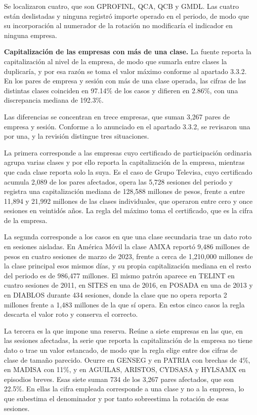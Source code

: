 Se localizaron cuatro, que son GPROFINL, QCA, QCB y GMDL. Las cuatro están deslistadas y ninguna registró importe operado en el periodo, de modo que su incorporación al numerador de la rotación no modificaría el indicador en ninguna empresa.

\textbf{Capitalización de las empresas con más de una clase.} La fuente reporta la capitalización al nivel de la empresa, de modo que sumarla entre clases la duplicaría, y por esa razón se toma el valor máximo conforme al apartado 3.3.2. En los pares de empresa y sesión con más de una clase operada, las cifras de las distintas clases coinciden en 97.14\% de los casos y difieren en 2.86\%, con una discrepancia mediana de 192.3\%.

Las diferencias se concentran en trece empresas, que suman 3,267 pares de empresa y sesión. Conforme a lo anunciado en el apartado 3.3.2, se revisaron una por una, y la revisión distingue tres situaciones.

La primera corresponde a las empresas cuyo certificado de participación ordinaria agrupa varias clases y por ello reporta la capitalización de la empresa, mientras que cada clase reporta solo la suya. Es el caso de Grupo Televisa, cuyo certificado acumula 2,089 de los pares afectados, opera las 5,728 sesiones del periodo y registra una capitalización mediana de 128,588 millones de pesos, frente a entre 11,894 y 21,992 millones de las clases individuales, que operaron entre cero y once sesiones en veintidós años. La regla del máximo toma el certificado, que es la cifra de la empresa.

La segunda corresponde a los casos en que una clase secundaria trae un dato roto en sesiones aisladas. En América Móvil la clase AMXA reportó 9,486 millones de pesos en cuatro sesiones de marzo de 2023, frente a cerca de 1,210,000 millones de la clase principal esos mismos días, y su propia capitalización mediana en el resto del periodo es de 986,477 millones. El mismo patrón aparece en TELINT en cuatro sesiones de 2011, en SITES en una de 2016, en POSADA en una de 2013 y en DIABLOS durante 434 sesiones, donde la clase que no opera reporta 2 millones frente a 1,483 millones de la que sí opera. En estos cinco casos la regla descarta el valor roto y conserva el correcto.

La tercera es la que impone una reserva. Reúne a siete empresas en las que, en las sesiones afectadas, la serie que reporta la capitalización de la empresa no tiene dato o trae un valor estancado, de modo que la regla elige entre dos cifras de clase de tamaño parecido. Ocurre en GENSEG y en PATRIA con brechas de 4\%, en MADISA con 11\%, y en AGUILAS, ARISTOS, CYDSASA y HYLSAMX en episodios breves. Esas siete suman 734 de los 3,267 pares afectados, que son 22.5\%. En ellas la cifra empleada corresponde a una clase y no a la empresa, lo que subestima el denominador y por tanto sobreestima la rotación de esas sesiones.

